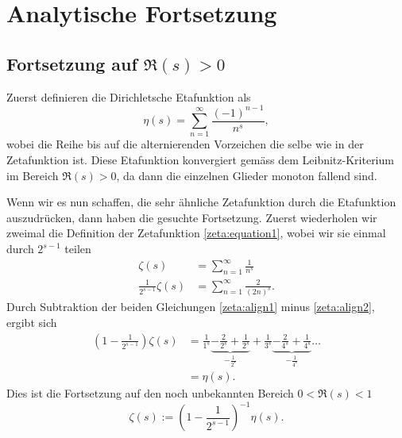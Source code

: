 \section{Analytische Fortsetzung} \label{zeta:section:analytische_fortsetzung}


\subsection{Fortsetzung auf $\Re(s) > 0$} \label{zeta:subsection:auf_bereich_ge_0}
Zuerst definieren die Dirichletsche Etafunktion als
\begin{equation}\label{zeta:equation:eta}
    \eta(s)
    =
    \sum_{n=1}^{\infty}
    \frac{(-1)^{n-1}}{n^s},
\end{equation}
wobei die Reihe bis auf die alternierenden Vorzeichen die selbe wie in der Zetafunktion ist.
Diese Etafunktion konvergiert gemäss dem Leibnitz-Kriterium im Bereich $\Re(s) > 0$, da dann die einzelnen Glieder monoton fallend sind.

Wenn wir es nun schaffen, die sehr ähnliche Zetafunktion durch die Etafunktion auszudrücken, dann haben die gesuchte Fortsetzung.
Zuerst wiederholen wir zweimal die Definition der Zetafunktion \eqref{zeta:equation1}, wobei wir sie einmal durch $2^{s-1}$ teilen
\begin{align}
    \zeta(s)
    &=
    \sum_{n=1}^{\infty}
    \frac{1}{n^s} \label{zeta:align1}
    \\
    \frac{1}{2^{s-1}}
    \zeta(s)
    &=
    \sum_{n=1}^{\infty}
    \frac{2}{(2n)^s}. \label{zeta:align2}
\end{align}
Durch Subtraktion der beiden Gleichungen \eqref{zeta:align1} minus \eqref{zeta:align2}, ergibt sich
\begin{align}
    \left(1 - \frac{1}{2^{s-1}} \right)
    \zeta(s)
    &=
    \frac{1}{1^s}
    \underbrace{-\frac{2}{2^s} + \frac{1}{2^s}}_{-\frac{1}{2^s}}
    + \frac{1}{3^s}
    \underbrace{-\frac{2}{4^s} + \frac{1}{4^s}}_{-\frac{1}{4^s}}
    \ldots
    \\
    &= \eta(s).
\end{align}
Dies ist die Fortsetzung auf den noch unbekannten Bereich $0 < \Re(s) < 1$
\begin{equation}
    \zeta(s)
    :=
    \left(1 - \frac{1}{2^{s-1}} \right)^{-1} \eta(s).
\end{equation}

